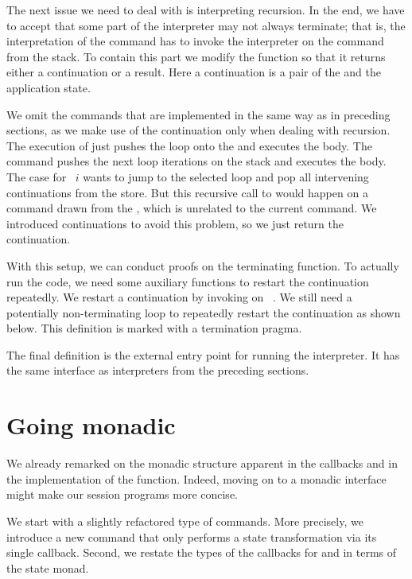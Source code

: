 \documentclass[acmsmall,screen]{acmart}
\begin{document}
The next issue we need to deal with is interpreting recursion. In the
end, we have to accept that some part of the interpreter may not always
terminate; that is, the interpretation of the {\ACONTINUE}
command has to invoke the interpreter on the {\AMU} command from the
stack. To contain this part we modify the {\Aexecutor} function so
that it returns either a continuation or a result. Here a continuation
is a pair of the {\ACommandStack} and the application state.
\rstAlternative

We omit the commands that are implemented in the same way as in
preceding sections, as we make use of the continuation only when dealing with recursion. 
The execution of {\AMU} just pushes the loop onto the
{\ACommandStack} and executes the body.
The {\AUNROLL} command pushes the next loop iterations on the stack
and executes the body.
The case for {\ACONTINUE~$i$} wants to jump to the selected loop and pop
all intervening continuations from the store. But this recursive
call to {\Aexecutor} would happen on a command drawn from the
{\ACommandStack}, which is unrelated to the current command.
We introduced continuations to avoid this problem, so we just return
the continuation.

With this setup, we can conduct proofs on the terminating {\Aexecutor}
function. To actually run the code, we need some auxiliary functions
to restart the continuation repeatedly.
We restart a continuation by invoking
{\Aexecutor} on ~\Azero. 
\rstAlternativeExecutorRestart
We still need a potentially non-terminating loop to repeatedly restart the
continuation as shown below. This definition is marked with a
termination pragma.
\rstAlternativeExecutorHSRestart

The final definition is the external entry point for running the
interpreter. It has the same interface as interpreters from the
preceding sections.

\section{Going monadic}
\label{sec:going-monadic}


We already remarked on the monadic structure apparent in the
callbacks and in the implementation of the {\Aexecutor}
function. Indeed, moving on to a monadic interface might make our session
programs more concise.

We start with a slightly refactored type of commands. More precisely,
we introduce a new {\ACSKIP} command that only performs a state 
transformation via its single callback.
Second, we restate the types of the callbacks for {\ACSEND} and
{\ACRECV} in terms of the state monad.
\end{document}

